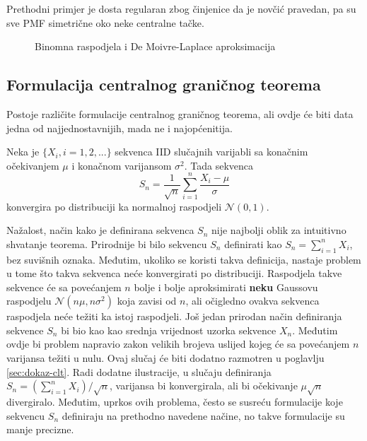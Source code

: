 Prethodni primjer je dosta regularan zbog činjenice da je novčić pravedan, pa su
sve PMF simetrične oko neke centralne tačke.

\begin{figure}[H]
  \centering
	\caption{Binomna raspodjela i De Moivre-Laplace aproksimacija}
  \label{fig:binom}
\end{figure}

\subsection{Formulacija centralnog graničnog teorema} \label{sec:clt-formulation}

Postoje različite formulacije centralnog graničnog teorema, ali ovdje će biti
data jedna od najjednostavnijih, mada ne i najopćenitija.

\begin{theorem} \label{th:clt}
  Neka je $\{X_i, i=1,2,...\}$ sekvenca IID slučajnih varijabli sa
  konačnim očekivanjem $\mu$ i konačnom varijansom $\sigma^2$. Tada
  sekvenca
  \begin{equation}
    S_n = \frac{1}{\sqrt{n}} \sum_{i=1}^{n} \frac{X_i-\mu}{\sigma}
  \end{equation}
  konvergira po distribuciji ka normalnoj raspodjeli $\mathcal{N}(0, 1)$.
\end{theorem}

Nažalost, način kako je definirana sekvenca $S_n$ nije najbolji oblik za
intuitivno shvatanje teorema. Prirodnije bi bilo sekvencu $S_n$ definirati kao
$S_n=\sum_{i=1}^{n} X_i$, bez suvišnih oznaka. Međutim, ukoliko se koristi takva
definicija, nastaje problem u tome što takva sekvenca neće konvergirati po
distribuciji. Raspodjela takve sekvence će sa povećanjem $n$ bolje i bolje
aproksimirati \textbf{neku} Gaussovu raspodjelu $\mathcal{N}(n\mu,n\sigma^2)$
koja zavisi od $n$, ali očigledno ovakva sekvenca raspodjela neće težiti ka
istoj raspodjeli. Još jedan prirodan način definiranja sekvence $S_n$ bi bio kao
kao srednja vrijednost uzorka sekvence $X_n$. Međutim ovdje bi problem napravio
zakon velikih brojeva uslijed kojeg će sa povećanjem $n$ varijansa težiti u
nulu. Ovaj slučaj će biti dodatno razmotren u poglavlju \ref{sec:dokaz-clt}.
Radi dodatne ilustracije, u slučaju definiranja $S_n = \left(\sum_{i=1}^n
X_i\right)/\sqrt{n}$, varijansa bi konvergirala, ali bi očekivanje $\mu
\sqrt{n}$ divergiralo. Međutim, uprkos ovih problema, često se susreću
formulacije koje sekvencu $S_n$ definiraju na prethodno navedene načine, no
takve formulacije su manje precizne. \\


